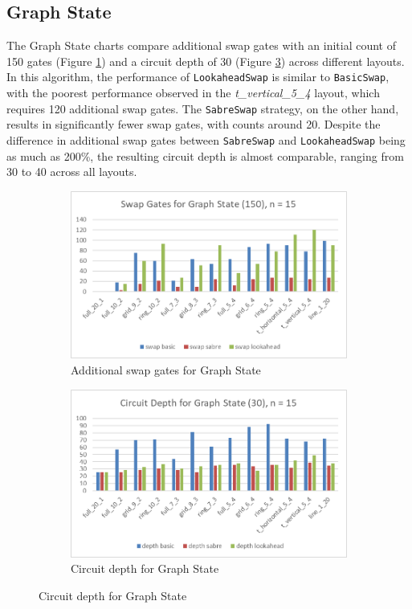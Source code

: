 \subsection{Graph State} %
The Graph State charts compare additional swap gates with an initial count of 150 gates (Figure \ref{fig:chart-graphstate}) and a circuit depth of 30 (Figure \ref{fig:chart-graphstate-depth}) across different layouts. In this algorithm, the performance of \lstinline{LookaheadSwap} is similar to \lstinline{BasicSwap}, with the poorest performance observed in the \textit{t\_vertical\_5\_4} layout, which requires 120 additional swap gates. The \lstinline{SabreSwap} strategy, on the other hand, results in significantly fewer swap gates, with counts around 20. Despite the difference in additional swap gates between \lstinline{SabreSwap} and \lstinline{LookaheadSwap} being as much as 200\%, the resulting circuit depth is almost comparable, ranging from 30 to 40 across all layouts.
\begin{figure}[htb]
    \centering
    \begin{subfigure}{0.48\linewidth}
        \includegraphics[width=\linewidth]{image/chart_graphstate.png}
        \caption{Additional swap gates for Graph State}
        \label{fig:chart-graphstate}
    \end{subfigure}
    \begin{subfigure}{0.48\linewidth}
        \includegraphics[width=\linewidth]{image/chart_graphstate_depth.png}
        \caption{Circuit depth for Graph State}
        \label{fig:chart-graphstate-depth}
    \end{subfigure}
\end{figure}

